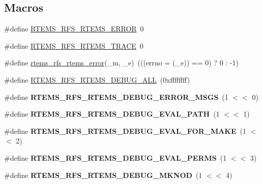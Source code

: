 \subsection*{Macros}
\begin{DoxyCompactItemize}
\item 
\#define \mbox{\hyperlink{rtems-rfs-rtems_8h_ac345c1150343a66565512a0d8640f33a}{R\+T\+E\+M\+S\+\_\+\+R\+F\+S\+\_\+\+R\+T\+E\+M\+S\+\_\+\+E\+R\+R\+OR}}~0
\item 
\#define \mbox{\hyperlink{rtems-rfs-rtems_8h_a1c9e9114088dc1cc10966acc099d45e0}{R\+T\+E\+M\+S\+\_\+\+R\+F\+S\+\_\+\+R\+T\+E\+M\+S\+\_\+\+T\+R\+A\+CE}}~0
\item 
\#define \mbox{\hyperlink{rtems-rfs-rtems_8h_a83f026a393cb9e796b40109e1431a2e1}{rtems\+\_\+rfs\+\_\+rtems\+\_\+error}}(\+\_\+m,  \+\_\+e)~(((errno = (\+\_\+e)) == 0) ? 0 \+: -\/1)
\item 
\#define \mbox{\hyperlink{rtems-rfs-rtems_8h_a25a16fbddd85208062d7ddbce2731101}{R\+T\+E\+M\+S\+\_\+\+R\+F\+S\+\_\+\+R\+T\+E\+M\+S\+\_\+\+D\+E\+B\+U\+G\+\_\+\+A\+LL}}~(0xffffffff)
\item 
\mbox{\label{rtems-rfs-rtems_8h_afdd4b4d6cd6b83634340bf6dcd472961}} 
\#define {\bfseries R\+T\+E\+M\+S\+\_\+\+R\+F\+S\+\_\+\+R\+T\+E\+M\+S\+\_\+\+D\+E\+B\+U\+G\+\_\+\+E\+R\+R\+O\+R\+\_\+\+M\+S\+GS}~(1 $<$$<$ 0)
\item 
\mbox{\label{rtems-rfs-rtems_8h_ab2790a1416953908ceff2c95db419abc}} 
\#define {\bfseries R\+T\+E\+M\+S\+\_\+\+R\+F\+S\+\_\+\+R\+T\+E\+M\+S\+\_\+\+D\+E\+B\+U\+G\+\_\+\+E\+V\+A\+L\+\_\+\+P\+A\+TH}~(1 $<$$<$ 1)
\item 
\mbox{\label{rtems-rfs-rtems_8h_aaa8ae0c4f69d1bd4449a5e7d68f7f451}} 
\#define {\bfseries R\+T\+E\+M\+S\+\_\+\+R\+F\+S\+\_\+\+R\+T\+E\+M\+S\+\_\+\+D\+E\+B\+U\+G\+\_\+\+E\+V\+A\+L\+\_\+\+F\+O\+R\+\_\+\+M\+A\+KE}~(1 $<$$<$ 2)
\item 
\mbox{\label{rtems-rfs-rtems_8h_a9a7836fe340c74dda32e278ee2ae8806}} 
\#define {\bfseries R\+T\+E\+M\+S\+\_\+\+R\+F\+S\+\_\+\+R\+T\+E\+M\+S\+\_\+\+D\+E\+B\+U\+G\+\_\+\+E\+V\+A\+L\+\_\+\+P\+E\+R\+MS}~(1 $<$$<$ 3)
\item 
\mbox{\label{rtems-rfs-rtems_8h_a5c4316c51265eddf0b98f006b2476433}} 
\#define {\bfseries R\+T\+E\+M\+S\+\_\+\+R\+F\+S\+\_\+\+R\+T\+E\+M\+S\+\_\+\+D\+E\+B\+U\+G\+\_\+\+M\+K\+N\+OD}~(1 $<$$<$ 4)
$$
\end{DoxyCompactItemize}
